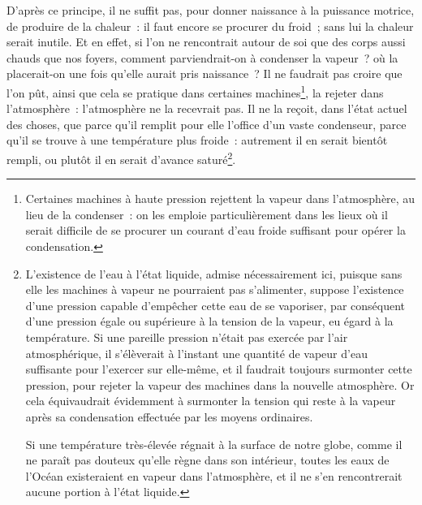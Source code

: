 \documentclass[french,twoside]{book} %
\begin{document}
D’après ce principe, il ne suffit pas, pour donner naissance à la puissance motrice, de produire de la chaleur : il faut encore se procurer du froid ; sans lui la chaleur serait inutile. Et en effet, si l’on ne rencontrait autour de soi que des corps aussi chauds que nos foyers, comment parviendrait-on à condenser la vapeur ? où la placerait-on une fois qu’elle aurait pris naissance ? Il ne faudrait pas croire que l’on pût, ainsi que cela se pratique dans certaines machines\footnote{Certaines machines à haute pression rejettent la vapeur dans l’atmosphère, au lieu de la condenser : on les emploie particulièrement dans les lieux où il serait difficile de se procurer un courant d’eau froide suffisant pour opérer la condensation.}, la rejeter dans l’atmosphère : l’atmosphère ne la recevrait pas. Il ne la reçoit, dans l’état actuel des choses, que parce qu’il remplit pour elle l’office d’un vaste condenseur, parce qu’il se trouve à une température plus froide : autrement il en serait bientôt rempli, ou plutôt il en serait d’avance saturé\footnote{ \noindent L’existence de l’eau à l’état liquide, admise nécessairement ici, puisque sans elle les machines à vapeur ne pourraient pas s’alimenter, suppose l’existence d’une pression capable d’empêcher cette eau de se vaporiser, par conséquent d’une pression égale ou supérieure à la tension de la vapeur, eu égard à la température. Si une pareille pression n’était pas exercée par l’air atmosphérique, il s’élèverait à l’instant une quantité de vapeur d’eau suffisante pour l’exercer sur elle-même, et il faudrait toujours surmonter cette pression, pour rejeter la vapeur des machines dans la nouvelle atmosphère. Or cela équivaudrait évidemment à surmonter la tension qui reste à la vapeur après sa condensation effectuée par les moyens ordinaires.\par
 Si une température très-élevée régnait à la surface de notre globe, comme il ne paraît pas douteux qu’elle règne dans son intérieur, toutes les eaux de l’Océan existeraient en vapeur dans l’atmosphère, et il ne s’en rencontrerait aucune portion à l’état liquide.
}.\par
\end{document}
